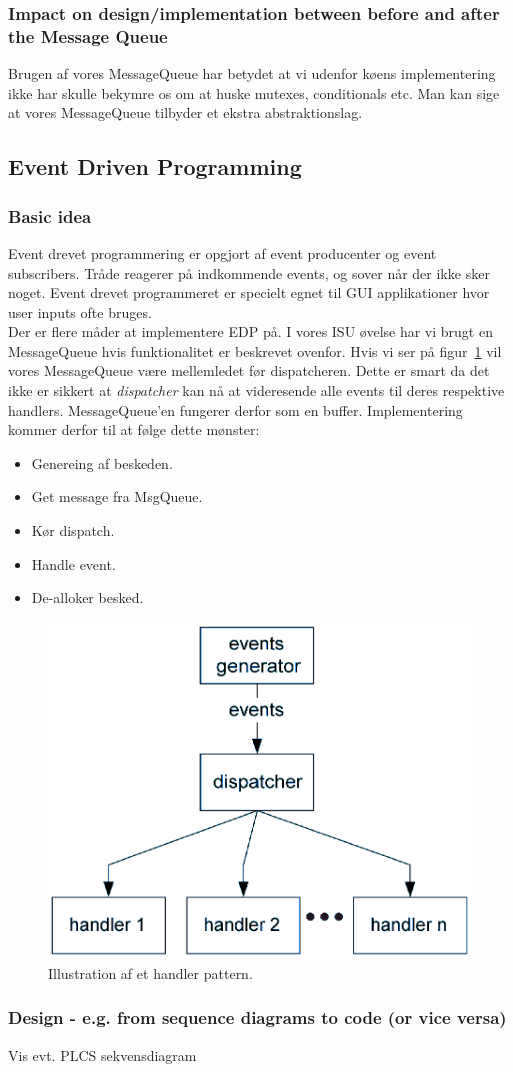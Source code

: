 \subsubsection{Impact on design/implementation between before and after the Message Queue}

Brugen af vores MessageQueue har betydet at vi udenfor køens implementering ikke har skulle bekymre os om at huske mutexes, conditionals etc. Man kan sige at vores MessageQueue tilbyder et ekstra abstraktionslag.

\subsection{Event Driven Programming}

\subsubsection{Basic idea}
Event drevet programmering er opgjort af event producenter og event subscribers.
Tråde reagerer på indkommende events, og sover når der ikke sker noget.
Event drevet programmeret er specielt egnet til GUI applikationer hvor user inputs ofte bruges. \\

Der er flere måder at implementere EDP på. I vores ISU øvelse har vi brugt en MessageQueue hvis funktionalitet er beskrevet ovenfor.
Hvis vi ser på figur~\ref{fig:handlPat} vil vores MessageQueue være mellemledet før dispatcheren. Dette er smart da det ikke er sikkert at \textit{dispatcher} kan nå at videresende alle events til deres respektive handlers. MessageQueue'en fungerer derfor som en buffer.
Implementering kommer derfor til at følge dette mønster:
\begin{itemize}
	\item Genereing af beskeden.
	\item Get message fra MsgQueue.
	\item Kør dispatch.
	\item Handle event.
	\item De-alloker besked.
\end{itemize}

\begin{figure}[h]
	\centering
	\includegraphics[width=0.6\linewidth]{figs/spm3/handlersPattern}
	\caption{Illustration af et handler pattern.}
	\label{fig:handlPat}
\end{figure}

\subsubsection{Design - e.g. from sequence diagrams to code (or vice versa)}
Vis evt. PLCS sekvensdiagram